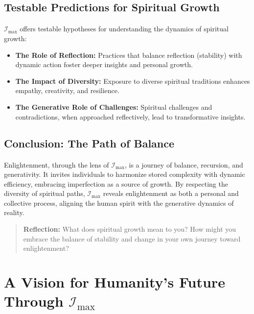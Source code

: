 \documentclass[12pt]{article}
\begin{document}
\subsection{Testable Predictions for Spiritual Growth}
\paragraph{}
\(\mathcal{I}_{\text{max}}\) offers testable hypotheses for understanding the dynamics of spiritual growth:
\begin{itemize}
    \item \textbf{The Role of Reflection:} Practices that balance reflection (stability) with dynamic action foster deeper insights and personal growth.
    \item \textbf{The Impact of Diversity:} Exposure to diverse spiritual traditions enhances empathy, creativity, and resilience.
    \item \textbf{The Generative Role of Challenges:} Spiritual challenges and contradictions, when approached reflectively, lead to transformative insights.
\end{itemize}

\subsection{Conclusion: The Path of Balance}
\paragraph{}
Enlightenment, through the lens of \(\mathcal{I}_{\text{max}}\), is a journey of balance, recursion, and generativity. It invites individuals to harmonize stored complexity with dynamic efficiency, embracing imperfection as a source of growth. By respecting the diversity of spiritual paths, \(\mathcal{I}_{\text{max}}\) reveals enlightenment as both a personal and collective process, aligning the human spirit with the generative dynamics of reality.

\begin{quote}
\textbf{Reflection:}  
What does spiritual growth mean to you? How might you embrace the balance of stability and change in your own journey toward enlightenment?
\end{quote}


\section{A Vision for Humanity’s Future Through \(\mathcal{I}_{\text{max}}\)}
\end{document}

